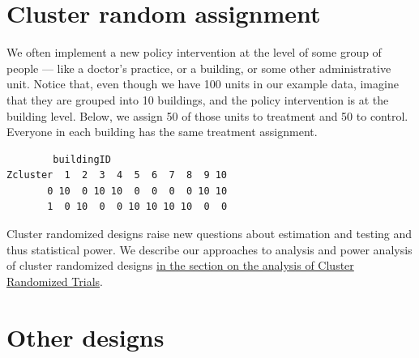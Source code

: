 \documentclass[
  12pt,
]{book}
\newenvironment{Shaded}{\begin{snugshade}}{\end{snugshade}}
\newcommand{\AttributeTok}[1]{\textcolor[rgb]{0.77,0.63,0.00}{#1}}
\newcommand{\DecValTok}[1]{\textcolor[rgb]{0.00,0.00,0.81}{#1}}
\newcommand{\DocumentationTok}[1]{\textcolor[rgb]{0.56,0.35,0.01}{\textbf{\textit{#1}}}}
\newcommand{\FunctionTok}[1]{\textcolor[rgb]{0.00,0.00,0.00}{#1}}
\newcommand{\NormalTok}[1]{#1}
\newcommand{\OtherTok}[1]{\textcolor[rgb]{0.56,0.35,0.01}{#1}}
\newcommand{\SpecialCharTok}[1]{\textcolor[rgb]{0.00,0.00,0.00}{#1}}
\theoremstyle{definition}
\theoremstyle{definition}
\theoremstyle{definition}
\theoremstyle{remark}
\begin{document}
\hypertarget{cluster-random-assignment}{%
\section{Cluster random assignment}\label{cluster-random-assignment}}

We often implement a new policy intervention at the level of some group
of people --- like a doctor's practice, or a building, or some other
administrative unit. Notice that, even though we have 100 units in our
example data, imagine that they are grouped into 10 buildings, and the
policy intervention is at the building level. Below, we assign 50 of
those units to treatment and 50 to control. Everyone in each building
has the same treatment assignment.

\begin{Shaded}
\end{Shaded}

\begin{verbatim}
        buildingID
Zcluster  1  2  3  4  5  6  7  8  9 10
       0 10  0 10 10  0  0  0  0 10 10
       1  0 10  0  0 10 10 10 10  0  0
\end{verbatim}

Cluster randomized designs raise new questions about estimation and
testing and thus statistical power. We describe our approaches to
analysis and power analysis of cluster randomized designs
\protect\hyperlink{clusterrandanalysis}{in the section on the analysis
of Cluster Randomized Trials}.

\hypertarget{other-designs}{%
\section{Other designs}\label{other-designs}}
\end{document}
